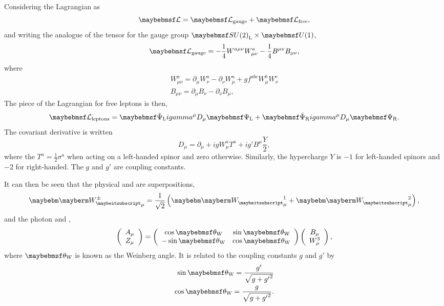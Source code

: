 Considering the Lagrangian as
\begin{equation*}
\lagrangiand = \lagrangiand_{\textrm{gauge}} + \lagrangiand_{\textrm{free}},
\end{equation*}
and writing the analogue of the tensor \Fmunu for the gauge group
$\SUtwo_{\textrm{L}}\times\Uone$,
\begin{equation*}
\lagrangiand_{\textrm{gauge}} = -\frac{1}{4} W^{a\mu\nu} W^a_{\mu\nu}
-\frac{1}{4} B^{\mu\nu}B_{\mu\nu},
\end{equation*}
where
\begin{eqnarray*}
W^{a}_{\mu\nu} = \partial_{\mu} W^a_{\nu} - \partial_{\nu}W^a_{\mu} + g f^{abc}
W^{b}_{\mu} W^c_{\nu}\\
B_{\mu\nu} = \partial_{\mu} B_{\nu} - \partial_{\nu} B_{\mu},
\end{eqnarray*}
The piece of the Lagrangian for free leptons is then,
\begin{equation*}
\lagrangiand_{\textrm{leptons}} = \APsiL i \gamma^{\mu} D_{\mu} \PsiL + \APsiR i
\gamma^{\mu} D_{\mu} \PsiR.
\end{equation*}
The covariant derivative is written
\begin{equation*}
D_{\mu} = \partial_{\mu} + i g W^a_{\mu} T^a + i g' B^{\mu}\frac{Y}{2},
\end{equation*}
where the $T^a = \frac{1}{2}\sigma^a$ when acting on a left-handed spinor and
zero otherwise. Similarly, the hypercharge $Y$ is $-1$ for left-handed spinors
and $-2$ for right-handed. The $g$ and $g'$ are coupling constants.

It can then be seen that the physical \PWp and \PWm are superpositions,
\begin{equation*}
\PWpm_{\mu} = \frac{1}{\sqrt{2}}\left(\PW^1_{\mu} + \PW^2_{\mu}\right),
\end{equation*}
and the photon and \PZ,
\begin{equation*}
\left(\begin{array}{c}A_{\mu} \\ Z_{\mu} \end{array}\right ) =
  \left ( \begin{array}{cc} \cos\thetaw & \sin\thetaw \\ -\sin\thetaw &
      \cos\thetaw\end{array}\right)
\left ( \begin{array}{c} B_{\mu} \\ W^3_{\mu} \end{array} \right ),
\end{equation*}
where $\thetaw$ is known as the Weinberg angle. It is related to the coupling
constants $g$ and $g'$ by
\begin{eqnarray}
\sin\thetaw = \frac{g'}{\sqrt{g + {g'}^2}} \\
\cos\thetaw = \frac{g}{\sqrt{g + {g'}^2}}.
\end{eqnarray}

